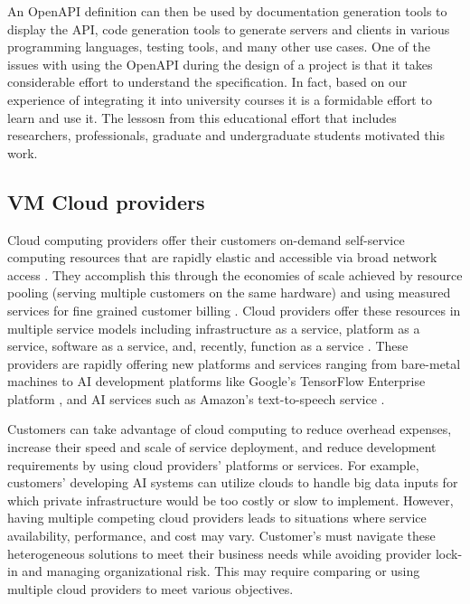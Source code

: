 An OpenAPI definition can then be used by documentation generation tools to display the API, code generation tools to generate servers and clients in various programming languages, testing tools, and many other use cases. One of the issues with using the OpenAPI during the design of a project is that it takes considerable effort to understand the specification. In fact, based on our experience of integrating it into university courses it is a formidable effort to learn and use it. The lessosn from this educational effort that includes researchers, professionals, graduate and undergraduate students motivated this work.

\subsection{VM Cloud providers}\label{vm-cloud-providers}

Cloud computing providers offer their customers on-demand self-service
computing resources that are rapidly elastic and accessible via broad
network access \cite{nist-cloud-standard}.
They accomplish this through the economies of scale achieved by resource
pooling (serving multiple customers on the same hardware) and using
measured services for fine grained customer billing \cite{nist-cloud-standard}.
Cloud providers offer these resources in multiple service models
including infrastructure as a service, platform as a service, software
as a service, and, recently, function as a service
\cite{nist-cloud-standard}.
These providers are rapidly offering new platforms and services ranging
from bare-metal machines to AI development platforms like Google's
TensorFlow Enterprise platform \cite{www-tensorflow-enterprise}, and AI services
such as Amazon's text-to-speech service \cite{amazon-polly}.

Customers can take advantage of cloud computing to reduce overhead
expenses, increase their speed and scale of service deployment, and
reduce development requirements by using cloud providers' platforms or
services. For example, customers' developing AI systems can utilize
clouds to handle big data inputs for which private infrastructure would
be too costly or slow to implement. However, having multiple competing
cloud providers leads to situations where service availability,
performance, and cost may vary. Customer's must navigate these
heterogeneous solutions to meet their business needs while avoiding
provider lock-in and managing organizational risk. This may require
comparing or using multiple cloud providers to meet various objectives.


